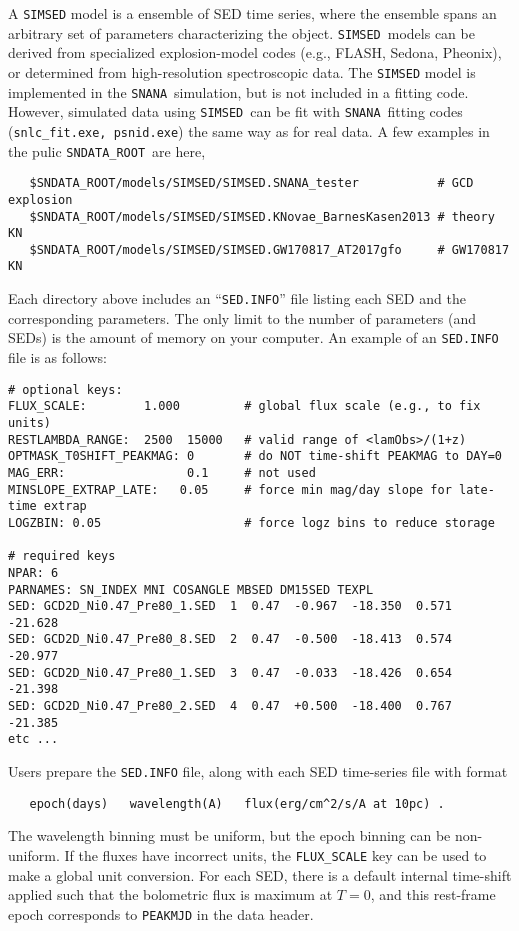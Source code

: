 \documentclass[12pt]{article}
\newcommand{\SIMSED}{{\tt SIMSED}}
\newcommand{\snana}{{\tt SNANA}}
\newcommand{\sndataroot}{{\tt SNDATA\_ROOT}}
\begin{document}
A {\SIMSED} model is a ensemble of SED time series, 
where the ensemble spans an arbitrary set of parameters
characterizing the object.
\SIMSED\ models can be derived from specialized explosion-model 
codes (e.g., FLASH, Sedona, Pheonix),
or determined from high-resolution spectroscopic data.
The {\SIMSED} model is implemented in the \snana\
simulation, but is not included in a fitting code. 
However, simulated data using \SIMSED\ can be fit with \snana\
fitting codes ({\tt snlc\_fit.exe, psnid.exe}) the same way as for real data.
A few examples in the pulic \sndataroot\ are here,
%
\begin{verbatim}
   $SNDATA_ROOT/models/SIMSED/SIMSED.SNANA_tester           # GCD explosion
   $SNDATA_ROOT/models/SIMSED/SIMSED.KNovae_BarnesKasen2013 # theory KN
   $SNDATA_ROOT/models/SIMSED/SIMSED.GW170817_AT2017gfo     # GW170817 KN
\end{verbatim}
%
Each directory above includes an ``{\tt SED.INFO}'' file listing
each SED and the corresponding parameters.
The only limit to the number of parameters (and SEDs)
is the amount of memory on your computer. 
An example of an {\tt SED.INFO} file is as follows:
\begin{Verbatim}[frame=single]
# optional keys:
FLUX_SCALE:        1.000         # global flux scale (e.g., to fix units)
RESTLAMBDA_RANGE:  2500  15000   # valid range of <lamObs>/(1+z)
OPTMASK_T0SHIFT_PEAKMAG: 0       # do NOT time-shift PEAKMAG to DAY=0
MAG_ERR:                 0.1     # not used
MINSLOPE_EXTRAP_LATE:   0.05     # force min mag/day slope for late-time extrap
LOGZBIN: 0.05                    # force logz bins to reduce storage

# required keys
NPAR: 6
PARNAMES: SN_INDEX MNI COSANGLE MBSED DM15SED TEXPL
SED: GCD2D_Ni0.47_Pre80_1.SED  1  0.47  -0.967  -18.350  0.571  -21.628
SED: GCD2D_Ni0.47_Pre80_8.SED  2  0.47  -0.500  -18.413  0.574  -20.977
SED: GCD2D_Ni0.47_Pre80_1.SED  3  0.47  -0.033  -18.426  0.654  -21.398
SED: GCD2D_Ni0.47_Pre80_2.SED  4  0.47  +0.500  -18.400  0.767  -21.385
etc ...
\end{Verbatim}
Users prepare the {\tt SED.INFO} file, along with each
SED time-series file with format
\begin{verbatim}
   epoch(days)   wavelength(A)   flux(erg/cm^2/s/A at 10pc) .
\end{verbatim}
The wavelength binning must be uniform, but the epoch binning
can be non-uniform.
If the fluxes have incorrect units, the {\tt FLUX\_SCALE} key
can be used to make a global unit conversion. 
For each SED, there is a default internal time-shift 
applied such that the bolometric flux is maximum at $T=0$,
and this rest-frame epoch corresponds to {\tt PEAKMJD} in the data header.
\end{document}

